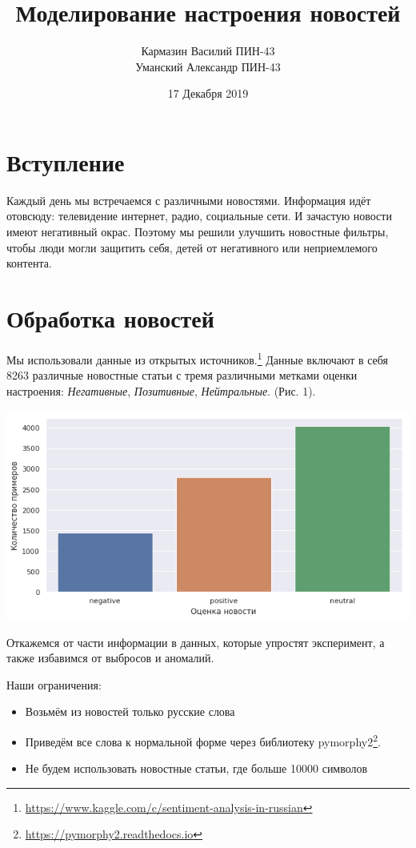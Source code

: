 \documentclass[12pt]{article}
\title{\textbf{Моделирование настроения новостей}}
\date{17 Декабря 2019}
\author{Кармазин Василий ПИН-43\\ Уманский Александр ПИН-43}
\begin{document}
    \maketitle

    \section{Вступление}
        Каждый день мы встречаемся с различными новостями. Информация идёт отовсюду: телевидение
        интернет, радио, социальные сети. И зачастую новости имеют негативный окрас.
        Поэтому мы решили улучшить новостные фильтры, чтобы люди могли защитить себя,
        детей от негативного или неприемлемого контента.

    \section{Обработка новостей}
        Мы использовали данные из открытых источников.\footnote{\href{https://www.kaggle.com/c/sentiment-analysis-in-russian}{https://www.kaggle.com/c/sentiment-analysis-in-russian}}
        Данные включают в себя 8263 различные новостные статьи с тремя различными метками оценки настроения: 
        \textit{Негативные}, \textit{Позитивные}, \textit{Нейтральные}. (Рис. 1).

        \begin{center}
            \includegraphics[scale=0.5]{sent_dist}
        \end{center}

        
        Откажемся от части информации в данных, которые упростят эксперимент, а также избавимся 
        от выбросов и аномалий. 
        
        Наши ограничения:
        \begin{itemize}
            \item Возьмём из новостей только русские слова
            \item Приведём все слова к нормальной форме через библиотеку pymorphy2\footnote{\href{https://pymorphy2.readthedocs.io}{https://pymorphy2.readthedocs.io}}.
            \item Не будем использовать новостные статьи, где больше 10000 символов
        \end{itemize}
\end{document}
